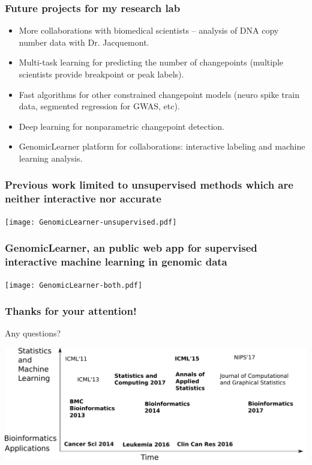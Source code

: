 \documentclass{beamer}
\begin{document}
\begin{frame}
  \frametitle{Future projects for my research lab}
  \begin{itemize}
  \item More collaborations with biomedical scientists -- analysis of
    DNA copy number data with Dr. Jacquemont.
  \item Multi-task learning for predicting the number of changepoints
    (multiple scientists provide breakpoint or peak labels).
  \item Fast algorithms for other constrained changepoint models
    (neuro spike train data, segmented regression for GWAS, etc).
  \item Deep learning for nonparametric changepoint detection.
  \item GenomicLearner platform for collaborations: interactive
    labeling and machine learning analysis.
  \end{itemize}
\end{frame}

\begin{frame}
  \frametitle{Previous work limited to 
    unsupervised methods
which are neither interactive nor accurate
}
  \texttt{[image: GenomicLearner-unsupervised.pdf]}
\end{frame}

\begin{frame}
  \frametitle{GenomicLearner, an public web app for supervised interactive machine learning in genomic data}
  \texttt{[image: GenomicLearner-both.pdf]}
\end{frame}


\begin{frame}
  \frametitle{Thanks for your attention!}

Any questions?

\hskip 1cm

\includegraphics[width=\textwidth]{timeline-SteJustine}




\end{frame}
\end{document}
